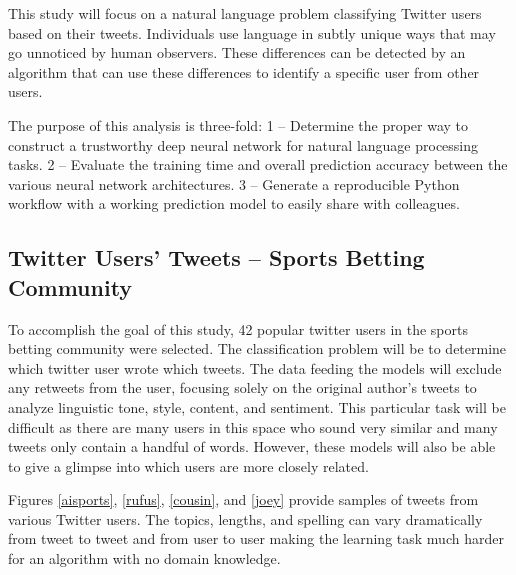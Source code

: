 \documentclass[5p,authoryear]{elsarticle}
\begin{document}
This study will focus on a natural language problem classifying Twitter users based on their tweets. Individuals use language in subtly unique ways that may go unnoticed by human observers. These differences can be detected by an algorithm that can use these differences to identify a specific user from other users. 

The purpose of this analysis is three-fold: 1 – Determine the proper way to construct a trustworthy deep neural network for natural language processing tasks. 2 – Evaluate the training time and overall prediction accuracy between the various neural network architectures. 3 – Generate a reproducible Python workflow with a working prediction model to easily share with colleagues. 



\subsection{Twitter Users’ Tweets – Sports Betting Community} \label{twitter}

To accomplish the goal of this study, 42 popular twitter users in the sports betting community were selected. The classification problem will be to determine which twitter user wrote which tweets. The data feeding the models will exclude any retweets from the user, focusing solely on the original author’s tweets to analyze linguistic tone, style, content, and sentiment. This particular task will be difficult as there are many users in this space who sound very similar and many tweets only contain a handful of words. However, these models will also be able to give a glimpse into which users are more closely related.

Figures \ref{aisports}, \ref{rufus}, \ref{cousin}, and \ref{joey} provide samples of tweets from various Twitter users. The topics, lengths, and spelling can vary dramatically from tweet to tweet and from user to user making the learning task much harder for an algorithm with no domain knowledge.
\end{document}
